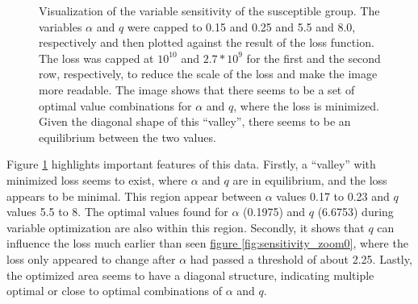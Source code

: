 \begin{figure}
\begin{subfigure}[b]{0.4\textwidth}
	\end{subfigure}
	\caption[Sensitivity analysis for $\alpha$ and $q$, capped]{Visualization of the variable sensitivity of the susceptible group. The variables $\alpha$ and $q$ were
		capped to 0.15 and 0.25 and 5.5 and 8.0, respectively and then plotted against the result of the loss function.
		The loss was capped at $10^{10}$ and $2.7*10^{9}$ for the first and the second row, respectively, to
		reduce the scale of the loss and make the image more readable. The image shows that there seems to be a set of
		optimal value combinations for $\alpha$ and $q$, where the loss is minimized. Given the diagonal shape of this
		``valley'', there seems to be an equilibrium between the two values.
		}
	\label{fig:sensitivity_zoom1}
\end{figure}

Figure \ref*{fig:sensitivity_zoom1} highlights important features of this data. Firstly, a ``valley'' with minimized loss
seems to exist, where $\alpha$ and $q$ are in equilibrium, and the loss appears to be minimal. This region 
appear between $\alpha$ values 0.17 to 0.23 and $q$ values 5.5 to 8.
The optimal values found for $\alpha$ (0.1975) and $q$ (6.6753) during variable optimization are also within this region.
Secondly, it shows that $q$ can influence the loss much earlier than seen \hyperref[fig:sensitivity_zoom0]{figure \ref*{fig:sensitivity_zoom0}},
where the loss only appeared to change after $\alpha$ had passed a threshold of about 2.25. Lastly, the optimized area seems
to have a diagonal structure, indicating multiple optimal or close to optimal combinations of $\alpha$ and $q$.

